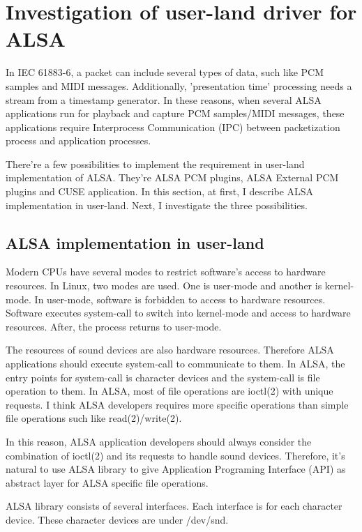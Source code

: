 \documentclass[onecolumn]{article}
\begin{document}
\section{Investigation of user-land driver for ALSA}

In IEC 61883-6\cite{iec61883-6-1,iec61883-6-2}, a packet can include several types of data, such like PCM samples and MIDI messages. Additionally, 'presentation time' processing needs a stream from a timestamp generator. In these reasons, when several ALSA applications run for playback and capture PCM samples/MIDI messages, these applications require Interprocess Communication (IPC) between packetization process and application processes.

There're a few possibilities to implement the requirement in user-land implementation of ALSA. They're ALSA PCM plugins, ALSA External PCM plugins and CUSE application. In this section, at first, I describe ALSA implementation in user-land. Next, I investigate the three possibilities.

\subsection{ALSA implementation in user-land}

Modern CPUs have several modes to restrict software's access to hardware resources. In Linux, two modes are used. One is user-mode and another is kernel-mode. In user-mode, software is forbidden to access to hardware resources. Software executes system-call to switch into kernel-mode and access to hardware resources. After, the process returns to user-mode.

The resources of sound devices are also hardware resources. Therefore ALSA applications should execute system-call to communicate to them. In ALSA, the entry points for system-call is character devices and the system-call is file operation to them. In ALSA, most of file operations are ioctl(2) with unique requests. I think ALSA developers requires more specific operations than simple file operations such like read(2)/write(2).

In this reason, ALSA application developers should always consider the combination of ioctl(2) and its requests to handle sound devices. Therefore, it's natural to use ALSA library to give Application Programing Interface (API) as abstract layer for ALSA specific file operations.

ALSA library consists of several interfaces. Each interface is for each character device. These character devices are under /dev/snd.
\end{document}
